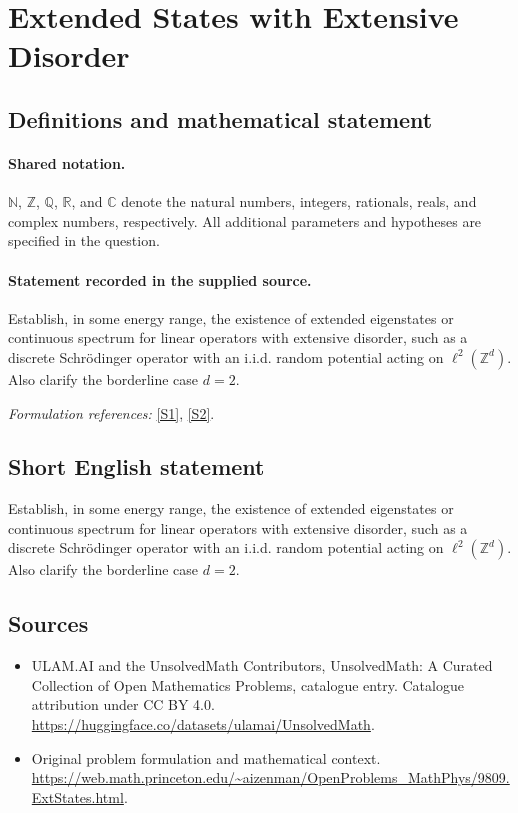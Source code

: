 \documentclass[11pt]{article}
\newcommand{\sref}[2]{\hyperlink{source:#1:#2}{[S#2]}}
\begin{document}
\section{Extended States with Extensive Disorder}\label{statement}

\subsection{Definitions and mathematical statement}

\paragraph{Shared notation.}$\mathbb N$, $\mathbb Z$, $\mathbb Q$, $\mathbb R$, and $\mathbb C$ denote the natural numbers, integers, rationals, reals, and complex numbers, respectively. All additional parameters and hypotheses are specified in the question.


\paragraph{Statement recorded in the supplied source.}
Establish, in some energy range, the existence of extended eigenstates or continuous spectrum for linear operators with extensive disorder, such as a discrete Schrödinger operator with an i.i.d. random potential acting on $\ell^2(\mathbb{Z}^d)$. Also clarify the borderline case $d=2$.
\par\smallskip\textit{Formulation references:} \sref{statement}{1}, \sref{statement}{2}.
\subsection{Short English statement}
Establish, in some energy range, the existence of extended eigenstates or continuous spectrum for linear operators with extensive disorder, such as a discrete Schrödinger operator with an i.i.d. random potential acting on $\ell^2(\mathbb{Z}^d)$. Also clarify the borderline case $d=2$.
\subsection{Sources}
\begin{itemize}
\item[\hypertarget{source:statement:1}{S1}] ULAM.AI and the UnsolvedMath Contributors, UnsolvedMath: A Curated Collection of Open Mathematics Problems, catalogue entry. Catalogue attribution under CC BY 4.0.
\url{https://huggingface.co/datasets/ulamai/UnsolvedMath}.
\item[\hypertarget{source:statement:2}{S2}] Original problem formulation and mathematical context.
\url{https://web.math.princeton.edu/~aizenman/OpenProblems_MathPhys/9809.ExtStates.html}.
\end{itemize}
\label{end:statement}
\end{document}
